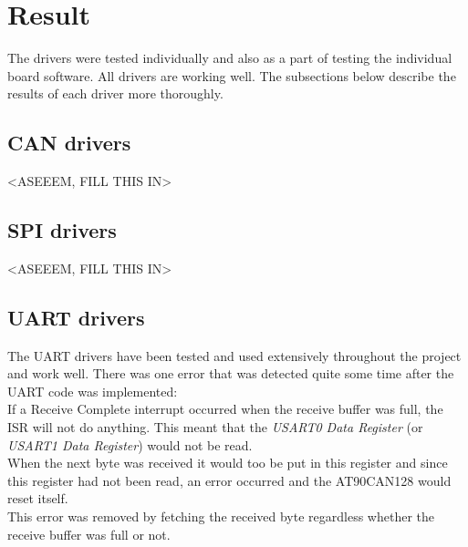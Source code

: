 
\section{Result}\label{sec:result}
The drivers were tested individually and also as a part of testing the individual board software. All drivers are working well. The subsections below describe the results of each driver more thoroughly.


\subsection{CAN drivers}
<ASEEEM, FILL THIS IN>

\subsection{SPI drivers}
<ASEEEM, FILL THIS IN>

\subsection{UART drivers}\label{sec:result_uart}
The UART drivers have been tested and used extensively throughout the project and work well. There was one error that was detected quite some time after the UART code was implemented: \\
If a Receive Complete interrupt occurred when the receive buffer was full, the ISR will not do anything. This meant that the \emph{USART0 Data Register} (or \emph{USART1 Data Register}) would not be read. \\
When the next byte was received it would too be put in this register and since this register had not been read, an error occurred and the AT90CAN128 would reset itself. \\
This error was removed by fetching the received byte regardless whether the receive buffer was full or not.